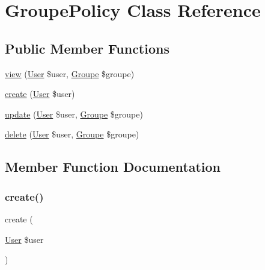 \hypertarget{class_app_1_1_policies_1_1_groupe_policy}{}\section{Groupe\+Policy Class Reference}
\label{class_app_1_1_policies_1_1_groupe_policy}
\subsection*{Public Member Functions}
\begin{DoxyCompactItemize}
\item 
\mbox{\hyperlink{class_app_1_1_policies_1_1_groupe_policy_ab3298e67fb40fb56f436fd88ece23fd6}{view}} (\mbox{\hyperlink{class_app_1_1_user}{User}} \$user, \mbox{\hyperlink{class_app_1_1_groupe}{Groupe}} \$groupe)
\item 
\mbox{\hyperlink{class_app_1_1_policies_1_1_groupe_policy_a7626db07d2ee9a50d2839c019dbf037d}{create}} (\mbox{\hyperlink{class_app_1_1_user}{User}} \$user)
\item 
\mbox{\hyperlink{class_app_1_1_policies_1_1_groupe_policy_ae367b45fb669740ee60ecc5c68b3e071}{update}} (\mbox{\hyperlink{class_app_1_1_user}{User}} \$user, \mbox{\hyperlink{class_app_1_1_groupe}{Groupe}} \$groupe)
\item 
\mbox{\hyperlink{class_app_1_1_policies_1_1_groupe_policy_a2cc562957f105d358a66a482773a4a29}{delete}} (\mbox{\hyperlink{class_app_1_1_user}{User}} \$user, \mbox{\hyperlink{class_app_1_1_groupe}{Groupe}} \$groupe)
\end{DoxyCompactItemize}


\subsection{Member Function Documentation}
\mbox{\label{class_app_1_1_policies_1_1_groupe_policy_a7626db07d2ee9a50d2839c019dbf037d}} 
\subsubsection{\texorpdfstring{create()}{create()}}
{\footnotesize\ttfamily create (\begin{DoxyParamCaption}\item[{\mbox{\hyperlink{class_app_1_1_user}{User}}}]{\$user }\end{DoxyParamCaption})}

